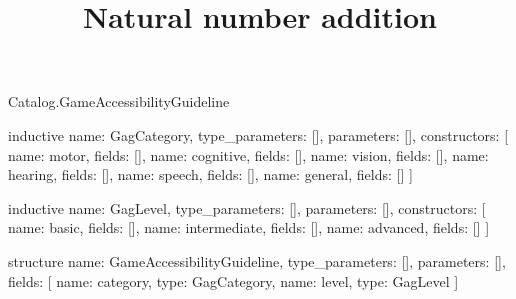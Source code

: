 \begin{lexlean}{Catalog.GameAccessibilityGuideline}
\title{Natural number addition}
\begin{semanticmodule}
inductive{
  name: GagCategory,
  type_parameters: [],
  parameters: [],
  constructors: [
    {name: motor, fields: []},
    {name: cognitive, fields: []},
    {name: vision, fields: []},
    {name: hearing, fields: []},
    {name: speech, fields: []},
    {name: general, fields: []}
  ]
}

inductive{
  name: GagLevel,
  type_parameters: [],
  parameters: [],
  constructors: [
    {name: basic, fields: []},
    {name: intermediate, fields: []},
    {name: advanced, fields: []}
  ]
}

structure{
  name: GameAccessibilityGuideline,
  type_parameters: [],
  parameters: [],
  fields: [
    {name: category, type: GagCategory},
    {name: level, type: GagLevel}
  ]
}
\end{semanticmodule}
\end{lexlean}
